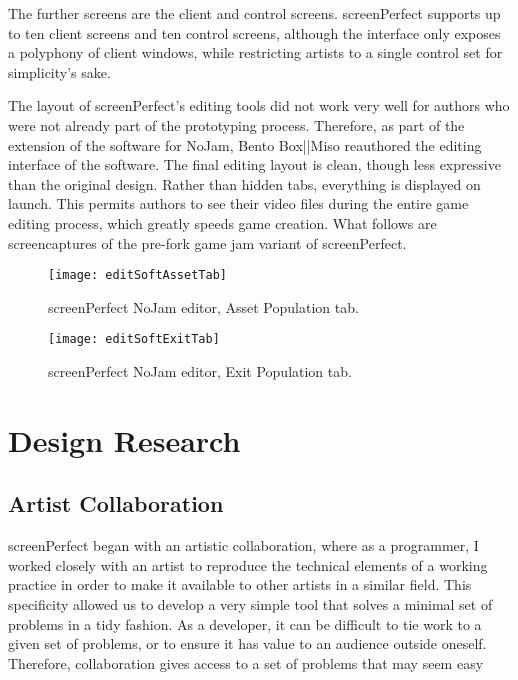 The further screens are the client and control screens. screenPerfect supports up to ten client screens and ten control screens, although the interface only exposes a polyphony of client windows, while restricting artists to a single control set for simplicity's sake.

The layout of screenPerfect's editing tools did not work very well for authors who were not already part of the prototyping process. Therefore, as part of the extension of the software for NoJam, Bento Box||Miso reauthored the editing interface of the software. 
The final editing layout is clean, though less expressive than the original design. Rather than hidden tabs, everything is displayed on launch. This permits authors to see their video files during the entire game editing process, which greatly speeds game creation. 
What follows are screencaptures of the pre-fork game jam variant of screenPerfect.

\newpage
\begin{figure}[h]
 \caption{screenPerfect NoJam editor, Asset Population tab.}
 \centering
 \texttt{[image: editSoftAssetTab]}
\end{figure}

\begin{figure}[h]
 \caption{screenPerfect NoJam editor, Exit Population tab.}
 \centering
 \texttt{[image: editSoftExitTab]}
\end{figure}

\newpage
\section{Design Research}
\subsection{Artist Collaboration}
screenPerfect began with an artistic collaboration, where as a programmer, I worked closely with an artist to reproduce the technical elements of a working practice in order to make it available to other artists in a similar field. This specificity allowed us to develop a very simple tool that solves a minimal set of problems in a tidy fashion. As a developer, it can be difficult to tie work to a given set of problems, or to ensure it has value to an audience outside oneself. Therefore, collaboration gives access to a set of problems that may seem easy 

